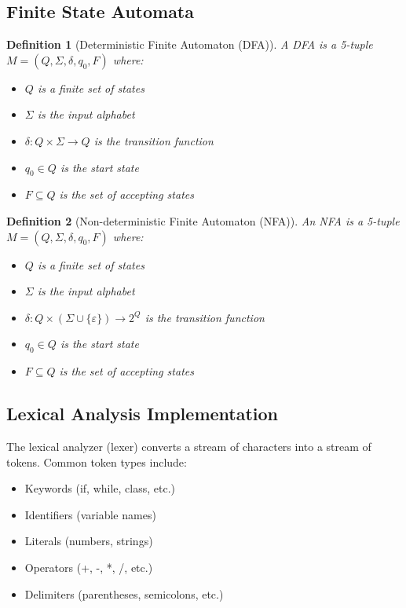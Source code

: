 \documentclass[11pt]{article}
\newtheorem{definition}{Definition}[section]
\begin{document}
\subsection{Finite State Automata}

\begin{definition}[Deterministic Finite Automaton (DFA)]
A DFA is a 5-tuple $M = (Q, \Sigma, \delta, q_0, F)$ where:
\begin{itemize}
    \item $Q$ is a finite set of states
    \item $\Sigma$ is the input alphabet
    \item $\delta: Q \times \Sigma \to Q$ is the transition function
    \item $q_0 \in Q$ is the start state
    \item $F \subseteq Q$ is the set of accepting states
\end{itemize}
\end{definition}

\begin{definition}[Non-deterministic Finite Automaton (NFA)]
An NFA is a 5-tuple $M = (Q, \Sigma, \delta, q_0, F)$ where:
\begin{itemize}
    \item $Q$ is a finite set of states
    \item $\Sigma$ is the input alphabet
    \item $\delta: Q \times (\Sigma \cup \{\varepsilon\}) \to 2^Q$ is the transition function
    \item $q_0 \in Q$ is the start state
    \item $F \subseteq Q$ is the set of accepting states
\end{itemize}
\end{definition}

\subsection{Lexical Analysis Implementation}

The lexical analyzer (lexer) converts a stream of characters into a stream of tokens. Common token types include:
\begin{itemize}
    \item Keywords (if, while, class, etc.)
    \item Identifiers (variable names)
    \item Literals (numbers, strings)
    \item Operators (+, -, *, /, etc.)
    \item Delimiters (parentheses, semicolons, etc.)
\end{itemize}
\end{document}
